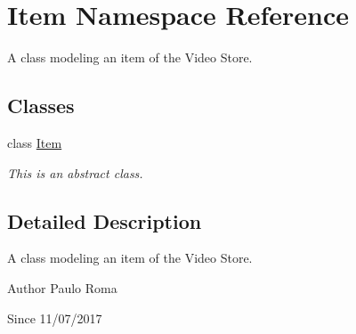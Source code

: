 \hypertarget{namespaceItem}{}\section{Item Namespace Reference}
\label{namespaceItem}


A class modeling an item of the Video Store.  


\subsection*{Classes}
\begin{DoxyCompactItemize}
\item 
class \hyperlink{classItem_1_1Item}{Item}
\begin{DoxyCompactList}\small\item\em This is an abstract class. \end{DoxyCompactList}\end{DoxyCompactItemize}


\subsection{Detailed Description}
A class modeling an item of the Video Store. 

\begin{DoxyAuthor}{Author}
Paulo Roma 
\end{DoxyAuthor}
\begin{DoxySince}{Since}
11/07/2017 
\end{DoxySince}
